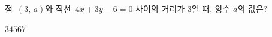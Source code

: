 점~$(3,\,a)$와 직선~$4x+3y-6=0$ 사이의 거리가 $3$일 때, 양수 $a$의 값은?
\begin{choices32}{$3$}{$4$}{$5$}{$6$}{$7$}\end{choices32}
